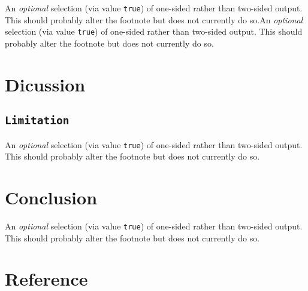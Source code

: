 \documentclass[letterpaper,9pt,twocolumn,twoside,]{pinp}
\begin{document}
An \emph{optional} selection (via value \texttt{true}) of one-sided
rather than two-sided output. This should probably alter the footnote
but does not currently do so.An \emph{optional} selection (via value
\texttt{true}) of one-sided rather than two-sided output. This should
probably alter the footnote but does not currently do so.

\hypertarget{dicussion}{%
\section{Dicussion}\label{dicussion}}

\hypertarget{limitation}{%
\subsection{\texorpdfstring{\texttt{Limitation}}{Limitation}}\label{limitation}}

An \emph{optional} selection (via value \texttt{true}) of one-sided
rather than two-sided output. This should probably alter the footnote
but does not currently do so.

\hypertarget{conclusion}{%
\section{Conclusion}\label{conclusion}}

An \emph{optional} selection (via value \texttt{true}) of one-sided
rather than two-sided output. This should probably alter the footnote
but does not currently do so.

\hypertarget{reference}{%
\section{Reference}\label{reference}}

\showacknow
\end{document}
